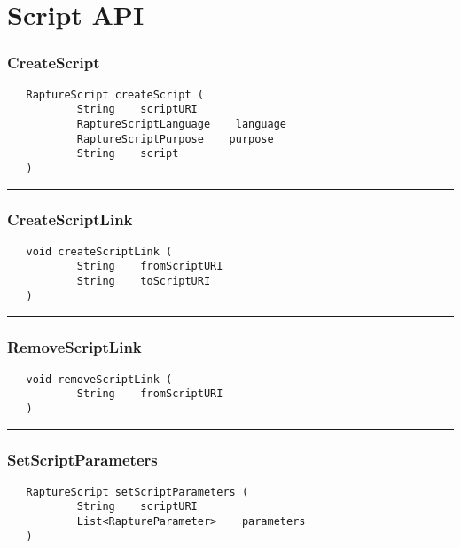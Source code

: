 \chapter{Script API}

\subsection{CreateScript}
\label{Api:CreateScript}
\begin{verbatim}
   RaptureScript createScript (
           String    scriptURI
           RaptureScriptLanguage    language
           RaptureScriptPurpose    purpose
           String    script
   )
\end{verbatim}



\rule{15cm}{2pt}
\subsection{CreateScriptLink}
\label{Api:CreateScriptLink}
\begin{verbatim}
   void createScriptLink (
           String    fromScriptURI
           String    toScriptURI
   )
\end{verbatim}



\rule{15cm}{2pt}
\subsection{RemoveScriptLink}
\label{Api:RemoveScriptLink}
\begin{verbatim}
   void removeScriptLink (
           String    fromScriptURI
   )
\end{verbatim}



\rule{15cm}{2pt}
\subsection{SetScriptParameters}
\label{Api:SetScriptParameters}
\begin{verbatim}
   RaptureScript setScriptParameters (
           String    scriptURI
           List<RaptureParameter>    parameters
   )
\end{verbatim}



